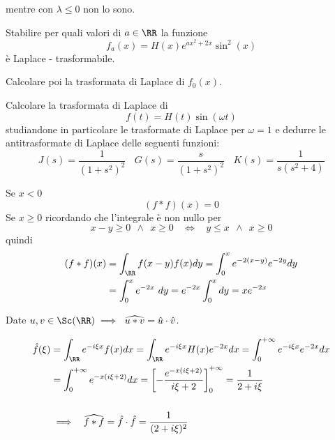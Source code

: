 mentre con $\displaystyle \lambda \leq 0$ non lo sono.

\Esercizio{}

Stabilire per quali valori di $\displaystyle a\in \RR $ la funzione
\begin{equation*}
f_{a}(x) = H(x) e^{ax^{2} + 2x}\sin^{2}(x)
\end{equation*}
è Laplace - trasformabile.

Calcolare poi la trasformata di Laplace di $\displaystyle f_{0}(x)$.

\Esercizio{}

Calcolare la trasformata di Laplace di
\begin{equation*}
f(t) = H(t)\sin(\omega t)
\end{equation*}
studiandone in particolare le trasformate di Laplace per $\displaystyle \omega = 1$ e dedurre le antitrasformate di Laplace delle seguenti funzioni:
\begin{equation*}
J(s) = \frac{1}{\left(1 + s^{2}\right)^{2}} \ \ \ \ G(s) = \frac{s}{\left(1 + s^{2}\right)^{2}} \ \ \ \ K(s) = \frac{1}{s\left(s^{2} + 4\right)}
\end{equation*}

\ParteSoluzioni

\Soluzione

Se $x < 0$
\begin{equation*}
(f*f)(x) = 0
\end{equation*}
Se $x \geq 0$ ricordando che l'integrale è non nullo per
\begin{equation*}
x - y \geq 0\ \ \land \ \ x \geq 0\ \ \ \ \iff \ \ \ \ y \leq x\ \ \land \ \ x \geq 0
\end{equation*}
quindi
\begin{align*}
(f*f)(x) & = \int_{\RR} f(x - y) f(x) dy = \int^{x}_{0} e^{- 2(x - y)} e^{- 2y} dy\\
 & = \int^{x}_{0} e^{- 2x} \ dy = e^{- 2x}\int^{x}_{0} dy = xe^{- 2x}
\end{align*}
\begin{thm}
Date $\displaystyle u, v\in \Sc (\RR) \implies \ \widehat{u*v} = \hat{u} \cdot \hat{v}$.
\end{thm}
\begin{align*}
\hat{f}(\xi) & = \int_{\RR} e^{- i\xi x} f(x) dx = \int_{\RR} e^{- i\xi x} H(x) e^{- 2x} dx = \int^{+ \infty}_{0} e^{- i\xi x} e^{- 2x} dx\\
 & = \int^{+ \infty}_{0} e^{- x(i\xi + 2)} dx = \left[ - \frac{e^{- x(i\xi + 2)}}{i\xi + 2}\right]^{+ \infty}_{0} = \frac{1}{2 + i\xi}\\
 & \\
 & \implies \ \ \widehat{f*f} = \hat{f} \cdot \hat{f} = \frac{1}{(2 + i\xi)^{2}}
\end{align*}


